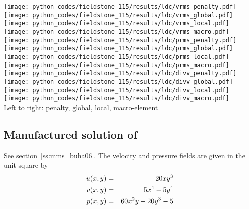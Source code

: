 \begin{center}
\texttt{[image: python\_codes/fieldstone\_115/results/ldc/vrms\_penalty.pdf]}
\texttt{[image: python\_codes/fieldstone\_115/results/ldc/vrms\_global.pdf]}
\texttt{[image: python\_codes/fieldstone\_115/results/ldc/vrms\_local.pdf]}
\texttt{[image: python\_codes/fieldstone\_115/results/ldc/vrms\_macro.pdf]}\\
\texttt{[image: python\_codes/fieldstone\_115/results/ldc/prms\_penalty.pdf]}
\texttt{[image: python\_codes/fieldstone\_115/results/ldc/prms\_global.pdf]}
\texttt{[image: python\_codes/fieldstone\_115/results/ldc/prms\_local.pdf]}
\texttt{[image: python\_codes/fieldstone\_115/results/ldc/prms\_macro.pdf]}\\
\texttt{[image: python\_codes/fieldstone\_115/results/ldc/divv\_penalty.pdf]}
\texttt{[image: python\_codes/fieldstone\_115/results/ldc/divv\_global.pdf]}
\texttt{[image: python\_codes/fieldstone\_115/results/ldc/divv\_local.pdf]}
\texttt{[image: python\_codes/fieldstone\_115/results/ldc/divv\_macro.pdf]}\\
{\captionfont Left to right: penalty, global, local, macro-element}
\end{center}

\newpage
\subsection*{Manufactured solution of \textcite{buha06}}

See section~\ref{ss:mms_buha06}.
The velocity and pressure fields are given in the unit square by
\begin{eqnarray}
u(x,y) &=& 20xy^3 \nonumber\\
v(x,y) &=& 5x^4-5y^4 \nonumber\\
p(x,y) &=& 60x^2y -20y^3 -5
\end{eqnarray}


